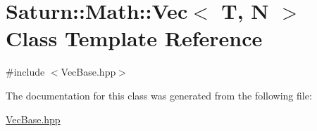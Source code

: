 \hypertarget{class_saturn_1_1_math_1_1_vec}{}\section{Saturn\+:\+:Math\+:\+:Vec$<$ T, N $>$ Class Template Reference}
\label{class_saturn_1_1_math_1_1_vec}


{\ttfamily \#include $<$Vec\+Base.\+hpp$>$}



The documentation for this class was generated from the following file\+:\begin{DoxyCompactItemize}
\item 
\mbox{\hyperlink{_vec_base_8hpp}{Vec\+Base.\+hpp}}\end{DoxyCompactItemize}
